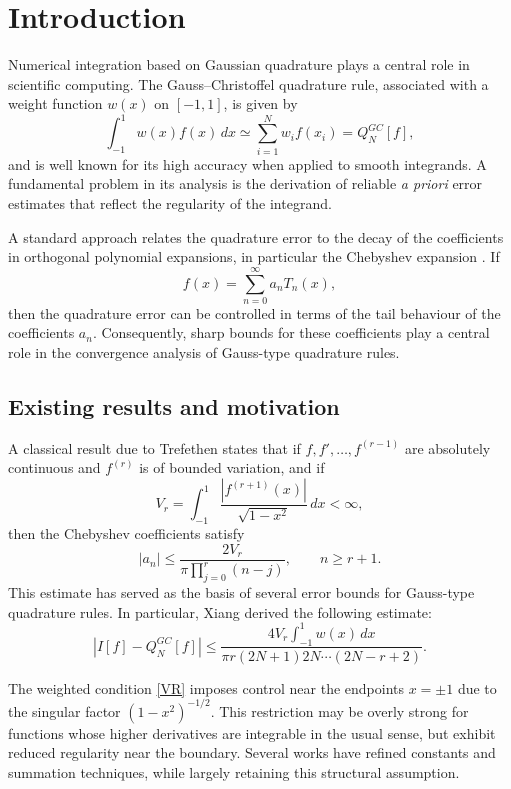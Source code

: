 \documentclass[12pt,a4paper]{article}
\begin{document}
\section{Introduction}
Numerical integration based on Gaussian quadrature plays a central role in scientific computing. The Gauss--Christoffel quadrature rule, associated with a weight function \(w(x)\) on \([-1,1]\), is given by
\begin{equation}\label{GC}
\int_{-1}^{1} w(x)f(x)\,dx \simeq \sum_{i=1}^{N} w_i f(x_i)=Q_{N}^{GC}[f],
\end{equation}
and is well known for its high accuracy when applied to smooth integrands. A fundamental problem in its analysis is the derivation of reliable \emph{a priori} error estimates that reflect the regularity of the integrand.

A standard approach relates the quadrature error to the decay of the coefficients in orthogonal polynomial expansions, in particular the Chebyshev expansion \cite{LN,LN2}. If
\[
f(x)=\sum_{n=0}^{\infty} a_n T_n(x),
\]
then the quadrature error can be controlled in terms of the tail behaviour of the coefficients \(a_n\). Consequently, sharp bounds for these coefficients play a central role in the convergence analysis of Gauss-type quadrature rules.

\subsection*{Existing results and motivation}
A classical result due to Trefethen \cite[Theorem~4.2]{LN} states that if
\(f,f',\ldots,f^{(r-1)}\) are absolutely continuous and \(f^{(r)}\) is of bounded variation, and if
\begin{equation}\label{VR}
V_r=\int_{-1}^{1}\frac{|f^{(r+1)}(x)|}{\sqrt{1-x^2}}\,dx<\infty,
\end{equation}
then the Chebyshev coefficients satisfy
\begin{equation}\label{LNbound}
|a_n|\le\frac{2V_r}{\pi\prod_{j=0}^r (n-j)},\qquad n\ge r+1.
\end{equation}
This estimate has served as the basis of several error bounds for Gauss-type quadrature rules. In particular, Xiang \cite{Xi} derived the following estimate:
\begin{equation}\label{xi}
\left|I[f]-Q_N^{GC}[f]\right|
\le
\frac{4V_r\int_{-1}^{1}w(x)\,dx}
{\pi r(2N+1)2N\cdots(2N-r+2)}.
\end{equation}

The weighted condition \eqref{VR} imposes control near the endpoints \(x=\pm1\) due to the singular factor \((1-x^2)^{-1/2}\). This restriction may be overly strong for functions whose higher derivatives are integrable in the usual sense, but exhibit reduced regularity near the boundary. Several works \cite{Ka,HM,Xia1,HHS} have refined constants and summation techniques, while largely retaining this structural assumption.
\end{document}
